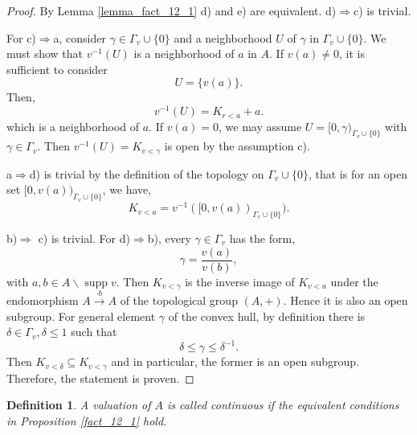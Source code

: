 \documentclass[8pt]{article}
\numberwithin{equation}{section}
\newtheorem{definition}{Definition}[subsection]
\DeclareMathOperator{\supp}{supp}
\begin{document}
\begin{proof}
    By Lemma \ref{lemma_fact_12_1} d) and e) are equivalent. d)$\Rightarrow$c) is trivial.
    \par For c)$\Rightarrow$a, consider $\gamma\in\Gamma_v\cup\{0\}$ and a neighborhood $U$ of $\gamma$ in $\Gamma_v\cup\{0\}$. We must show that $v^{-1}(U)$ is a neighborhood of $a$ in $A$. If $v(a)\not=0$, it is sufficient to consider 
    \begin{equation*}
        U = \{v(a)\}.
    \end{equation*}
    Then,
    \begin{equation*}
        v^{-1}(U) = K_{r<a}+a.
    \end{equation*}
    which is a neighborhood of $a$. If $v(a)=0$, we may assume $U=[0,\gamma)_{\Gamma_v\cup\{0\}}$ with $\gamma\in\Gamma_v$. Then $v^{-1}(U)=K_{v<\gamma}$ is open by the assumption c).
    \par a$\Rightarrow$d) is trivial by the definition of the topology on $\Gamma_v\cup\{0\}$, that is for an open set $[0,v(a))_{\Gamma_v\cup\{0\}}$, we have,
    \begin{equation*}
     K_{v<a} = v^{-1}([0,v(a))_{\Gamma_v\cup\{0\}}).
    \end{equation*}%
    \par b)$\Rightarrow$ c) is trivial. For d)$\Rightarrow$b), every $\gamma\in\Gamma_v$ has the form,
    \begin{equation*}
        \gamma  = {\frac {v(a)} {v(b)}},
    \end{equation*}
    with $a,b\in A\backslash\supp v$. Then $K_{v<\gamma}$ is the inverse image of $K_{v<a}$ under the endomorphism $A\stackrel{\cdot b}{\to}A$ of the topological group $(A,+)$. Hence it is also an open subgroup. For general element $\gamma$ of the convex hull, by definition there is $\delta\in\Gamma_v,\delta\leq 1$ such that 
    \begin{equation}
        \delta\leq \gamma\leq \delta^{-1}.
    \end{equation}
    Then $K_{v<\delta}\subseteq K_{v<\gamma}$ and in particular, the former is an open subgroup. Therefore, the statement is proven.
\end{proof}
\begin{definition}
    \label{definition_12_1}
    A valuation of $A$ is called continuous if the equivalent conditions in Proposition \ref{fact_12_1} hold.
\end{definition}
\end{document}
